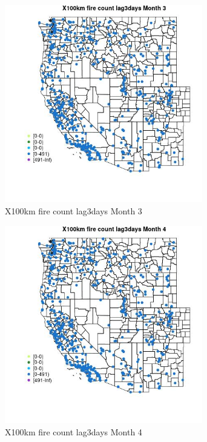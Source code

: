 \begin{figure} 
\centering  
\includegraphics[width=0.77\textwidth]{Code_Outputs/Report_ML_input_PM25_Step4_part_e_de_duplicated_aves_compiled_2019-05-14wNAs_MapObsMo3X100km_fire_count_lag3days.jpg} 
\caption{\label{fig:Report_ML_input_PM25_Step4_part_e_de_duplicated_aves_compiled_2019-05-14wNAsMapObsMo3X100km_fire_count_lag3days}X100km fire count lag3days Month 3} 
\end{figure} 
 

\begin{figure} 
\centering  
\includegraphics[width=0.77\textwidth]{Code_Outputs/Report_ML_input_PM25_Step4_part_e_de_duplicated_aves_compiled_2019-05-14wNAs_MapObsMo4X100km_fire_count_lag3days.jpg} 
\caption{\label{fig:Report_ML_input_PM25_Step4_part_e_de_duplicated_aves_compiled_2019-05-14wNAsMapObsMo4X100km_fire_count_lag3days}X100km fire count lag3days Month 4} 
\end{figure} 
 

